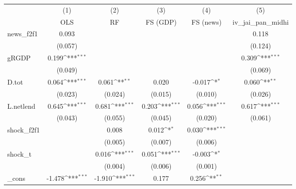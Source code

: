 {
\def\sym#1{\ifmmode^{#1}\else\(^{#1}\)\fi}
\begin{tabular}{l*{5}{c}}
\toprule
            &\multicolumn{1}{c}{(1)}&\multicolumn{1}{c}{(2)}&\multicolumn{1}{c}{(3)}&\multicolumn{1}{c}{(4)}&\multicolumn{1}{c}{(5)}\\
            &\multicolumn{1}{c}{OLS}&\multicolumn{1}{c}{RF}&\multicolumn{1}{c}{FS (GDP)}&\multicolumn{1}{c}{FS (news)}&\multicolumn{1}{c}{iv\_jai\_pan\_midhi}\\
\midrule
news\_f2f1   &       0.093         &                     &                     &                     &       0.118         \\
            &     (0.057)         &                     &                     &                     &     (0.124)         \\
\addlinespace
gRGDP       &       0.199\sym{***}&                     &                     &                     &       0.309\sym{***}\\
            &     (0.049)         &                     &                     &                     &     (0.069)         \\
\addlinespace
D.tot       &       0.064\sym{***}&       0.061\sym{**} &       0.020         &      -0.017\sym{*}  &       0.060\sym{**} \\
            &     (0.023)         &     (0.024)         &     (0.015)         &     (0.010)         &     (0.026)         \\
\addlinespace
L.netlend   &       0.645\sym{***}&       0.681\sym{***}&       0.203\sym{***}&       0.056\sym{***}&       0.617\sym{***}\\
            &     (0.043)         &     (0.055)         &     (0.045)         &     (0.020)         &     (0.061)         \\
\addlinespace
shock\_f2f1  &                     &       0.008         &       0.012\sym{*}  &       0.030\sym{***}&                     \\
            &                     &     (0.005)         &     (0.007)         &     (0.006)         &                     \\
\addlinespace
shock\_t     &                     &       0.016\sym{***}&       0.051\sym{***}&      -0.003\sym{*}  &                     \\
            &                     &     (0.004)         &     (0.006)         &     (0.001)         &                     \\
\addlinespace
\_cons      &      -1.478\sym{***}&      -1.910\sym{***}&       0.177         &       0.256\sym{**} &                     \\

\end{tabular}}

